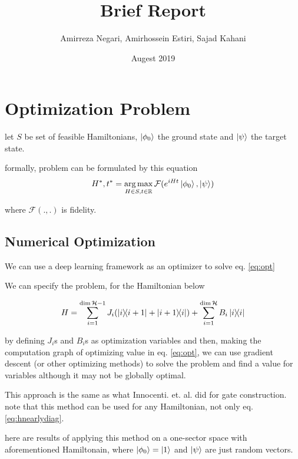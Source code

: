\documentclass{article}
\title{Brief Report}
\author{Amirreza Negari, Amirhossein Estiri, Sajad Kahani}
\date{Augest 2019}
\DeclareMathOperator*{\argmax}{arg\,max}
\begin{document}
\maketitle

\section{Optimization Problem}
let $S$ be set of feasible Hamiltonians, $\ket{\phi_0}$ the ground state and $\ket{\psi}$ the target state.

formally, problem can be formulated by this equation
\begin{equation} 
\label{eq:opt}
H^*, t^* = \argmax_{H \in S, t \in \mathbb{R}} \mathcal{F}(e^{iHt} \ket{\phi_0}, \ket{\psi})
\end{equation}

where $\mathcal{F}(., .)$ is fidelity.

\subsection{Numerical Optimization}
We can use a deep learning framework as an optimizer to solve eq. \ref{eq:opt}

We can specify the problem, for the Hamiltonian below

\begin{equation} 
\label{eq:hnearlydiag}
H = \sum_{i=1}^{\dim \mathcal{H} - 1} J_i (\dyad{i}{i + 1} + \dyad{i + 1}{i})  + \sum_{i=1}^{\dim \mathcal{H}} B_i \dyad{i}{i} 
\end{equation}

by defining $J_i$s and $B_i$s as optimization variables and then, making the computation graph of optimizing value in eq. \ref{eq:opt}, we can use gradient descent (or other optimizing methods) to solve the problem and find a value for variables although it may not be globally optimal.

This approach is the same as what Innocenti. et. al. did for gate construction. note that this method can be used for any Hamiltonian, not only eq. \ref{eq:hnearlydiag}.

here are results of applying this method on a one-sector space with aforementioned Hamiltonain, where $\ket{\phi_0} = \ket{1}$ and $\ket{\psi}$ are just random vectors.
\end{document}
